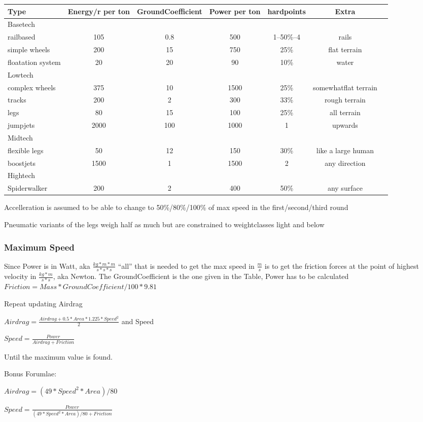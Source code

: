 \begin{tabular}{l|cccccl}
    Type    & Energy/r per ton & GroundCoefficient & Power per ton & hardpoints &Extra\\
    \hline
    Basetech\\
    railbased            & 105 & 0.8 & 500 & 1--50\%--4 & rails \\
    simple wheels        & 200 & 15 & 750 & 25\% & flat terrain \\
    floatation system    & 20 & 20 &  90 & 10\% & water\\
    \hline
    Lowtech\\
    complex wheels       & 375 & 10 & 1500 & 25\% &  somewhatflat terrain \\
    tracks               & 200 & 2 & 300 & 33\% & rough terrain\\
    legs                 & 80 & 15 & 100 & 25\% & all terrain\\
    jumpjets             & 2000 & 100 & 1000 & 1 & upwards\\
    \hline
    Midtech\\
    flexible legs        & 50 & 12 & 150 & 30\% &  like a large human\\
    boostjets            & 1500 & 1 & 1500 & 2 &  any direction\\
    \hline Hightech\\
    Spiderwalker         & 200 & 2 & 400 & 50\% & any surface
\end{tabular}

Accelleration is assumed to be able to change to 50\%/80\%/100\% of max speed  in the first/second/third round\par
Pneumatic variants of the legs weigh half as much but are constrained to weightclasses light and below\par

\subsubsection{Maximum Speed}
Since Power is in Watt, aka
\(\frac{kg*m*m}{s*s*s}\)
``all'' that is needed to get the max speed in
\(\frac{m}{s}\) is to get
the friction forces at the point of highest velocity in \(\frac{kg*m}{s*s}\), aka Newton.
The GroundCoefficient is the one given in the Table, Power has to be calculated
\(Friction = Mass* GroundCoefficient/100 * 9.81\)\par
Repeat updating Airdrag\par
\(Airdrag = \frac{Airdrag + 0.5*Area*1.225 * Speed^2}{2}\)
and Speed\par
\(Speed = \frac{Power}{Airdrag + Friction}\)\par
Until the maximum value is found.\par
Bonus Forumlae:\par
\(Airdrag = (49*Speed^2*Area)/80 \) \par
\(Speed = \frac{Power}{(49*Speed^2*Area)/80 + Friction}\)


